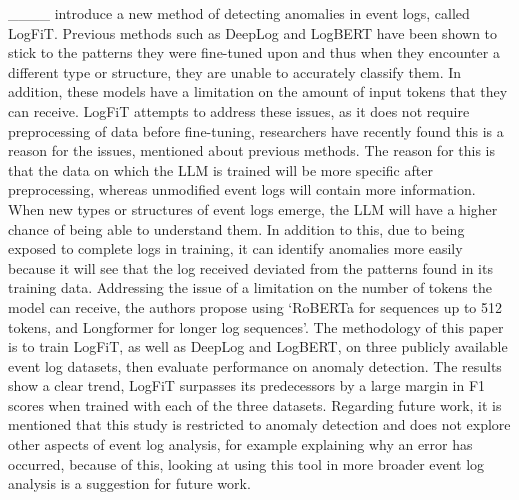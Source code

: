 ____ introduce a new method of detecting anomalies in event logs, called LogFiT. Previous methods such as DeepLog and LogBERT have been shown to stick to the patterns they were fine-tuned upon and thus when they encounter a different type or structure, they are unable to accurately classify them. In addition, these models have a limitation on the amount of input tokens that they can receive. LogFiT attempts to address these issues, as it does not require preprocessing of data before fine-tuning, researchers have recently found this is a reason for the issues, mentioned about previous methods. The reason for this is that the data on which the LLM is trained will be more specific after preprocessing, whereas unmodified event logs will contain more information. When new types or structures of event logs emerge, the LLM will have a higher chance of being able to understand them. In addition to this, due to being exposed to complete logs in training, it can identify anomalies more easily because it will see that the log received deviated from the patterns found in its training data. Addressing the issue of a limitation on the number of tokens the model can receive, the authors propose using `RoBERTa for sequences up to 512 tokens, and Longformer for longer log sequences'. The methodology of this paper is to train LogFiT, as well as DeepLog and LogBERT, on three publicly available event log datasets, then evaluate performance on anomaly detection. The results show a clear trend, LogFiT surpasses its predecessors by a large margin in F1 scores when trained with each of the three datasets. Regarding future work, it is mentioned that this study is restricted to anomaly detection and does not explore other aspects of event log analysis, for example explaining why an error has occurred, because of this, looking at using this tool in more broader event log analysis is a suggestion for future work. 

